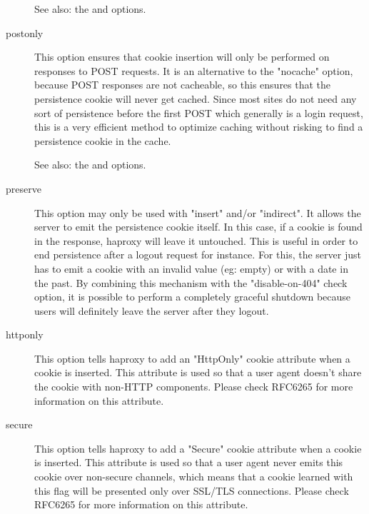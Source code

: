 \begin{description}
See also: the  and  options.

  \item[postonly]
              This option ensures that cookie insertion will only be performed
              on responses to POST requests. It is an alternative to the
              "nocache" option, because POST responses are not cacheable, so
              this ensures that the persistence cookie will never get cached.
              Since most sites do not need any sort of persistence before the
              first POST which generally is a login request, this is a very
              efficient method to optimize caching without risking to find a
              persistence cookie in the cache.

See also: the  and  options.

  \item[preserve]
              This option may only be used with "insert" and/or "indirect". It
              allows the server to emit the persistence cookie itself. In this
              case, if a cookie is found in the response, haproxy will leave it
              untouched. This is useful in order to end persistence after a
              logout request for instance. For this, the server just has to
              emit a cookie with an invalid value (eg: empty) or with a date in
              the past. By combining this mechanism with the "disable-on-404"
              check option, it is possible to perform a completely graceful
              shutdown because users will definitely leave the server after
              they logout.

  \item[httponly]
              This option tells haproxy to add an "HttpOnly" cookie attribute
              when a cookie is inserted. This attribute is used so that a
              user agent doesn't share the cookie with non-HTTP components.
              Please check RFC6265 for more information on this attribute.

  \item[secure]
              This option tells haproxy to add a "Secure" cookie attribute when
              a cookie is inserted. This attribute is used so that a user agent
              never emits this cookie over non-secure channels, which means
              that a cookie learned with this flag will be presented only over
              SSL/TLS connections. Please check RFC6265 for more information on
              this attribute.


\end{description}
